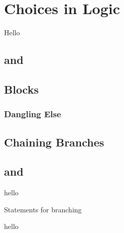 \section{Choices in Logic}
\label{sec:flow:branch}

Hello

\subsection{ and }
\subsection{}
\subsection{Blocks}

\subsubsection{Dangling Else}
\label{sec:flow:branch:danglingelse}

\subsection{Chaining Branches}
\subsection{ and }

\csharpsubsection{\csharp}
hello

\begin{syntaxfloat}
  
  \caption{Statements for branching}
  \label{syntax:flow:branch}
\end{syntaxfloat}

hello
